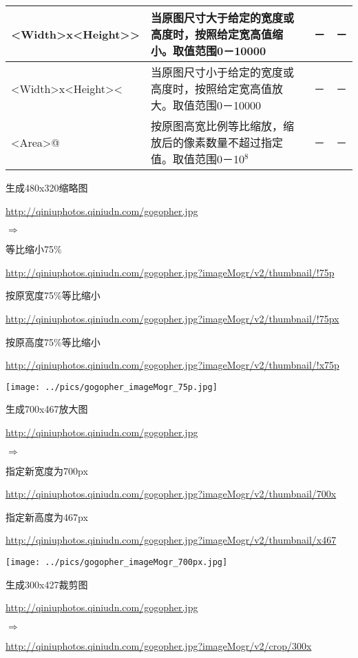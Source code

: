 \documentclass[11pt, oneside]{book}
\newcommand{\qpar}[1]{
\vspace{0.25em}
\noindent
#1\par
\vspace{0.25em}
}
\newcommand{\qurl}[1]{\url{#1}}
\begin{document}
\begin{CJK*}{UTF8}{song}
{\begin{tabular}[t]{|l|p{18em}|p{5em}|p{5em}|}
\hline
\textless Width\textgreater x\textless Height\textgreater \textgreater & 当原图尺寸大于给定的宽度或高度时，按照给定宽高值缩小。取值范围0－10000 & － & － \\
\hline
\textless Width\textgreater x\textless Height\textgreater \textless & 当原图尺寸小于给定的宽度或高度时，按照给定宽高值放大。取值范围0－10000 & － & － \\
\hline
\textless Area\textgreater @ & 按原图高宽比例等比缩放，缩放后的像素数量不超过指定值。取值范围0－10$^8$ & － & － \\
\hline
\end{tabular}
}

\begin{sample}
  \caption{生成480x320缩略图}
    \qpar{\qurl{http://qiniuphotos.qiniudn.com/gogopher.jpg}}
    \qpar{$\Rightarrow$}
    \qpar{等比缩小75\%}
    \qpar{\qurl{http://qiniuphotos.qiniudn.com/gogopher.jpg?imageMogr/v2/thumbnail/!75p}}
    \qpar{按原宽度75\%等比缩小}
    \qpar{\qurl{http://qiniuphotos.qiniudn.com/gogopher.jpg?imageMogr/v2/thumbnail/!75px}}
    \qpar{按原高度75\%等比缩小}
    \qpar{\qurl{http://qiniuphotos.qiniudn.com/gogopher.jpg?imageMogr/v2/thumbnail/!x75p}}

    \begin{center}
      \texttt{[image: ../pics/gogopher\_imageMogr\_75p.jpg]}
    \end{center}
  \label{imageMogr-thumbnail-75p}
\end{sample}

\begin{sample}
  \caption{生成700x467放大图}
    \qpar{\qurl{http://qiniuphotos.qiniudn.com/gogopher.jpg}}
    \qpar{$\Rightarrow$}
    \qpar{指定新宽度为700px}
    \qpar{\qurl{http://qiniuphotos.qiniudn.com/gogopher.jpg?imageMogr/v2/thumbnail/700x}}
    \qpar{指定新高度为467px}
    \qpar{\qurl{http://qiniuphotos.qiniudn.com/gogopher.jpg?imageMogr/v2/thumbnail/x467}}

    \begin{center}
      \texttt{[image: ../pics/gogopher\_imageMogr\_700px.jpg]}
    \end{center}
  \label{imageMogr-thumbnail-700px}
\end{sample}

\begin{sample}
  \caption{生成300x427裁剪图}
    \qpar{\qurl{http://qiniuphotos.qiniudn.com/gogopher.jpg}}
    \qpar{$\Rightarrow$}
    \qpar{\qurl{http://qiniuphotos.qiniudn.com/gogopher.jpg?imageMogr/v2/crop/300x}}


\end{sample}
\end{CJK*}
\end{document}
